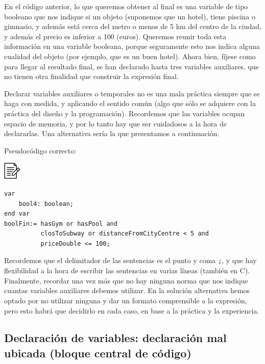 \documentclass[
]{book}
\begin{document}
En el código anterior, lo que queremos obtener al final es una variable de tipo booleano que nos indique si un objeto (suponemos que un hotel), tiene piscina o gimnasio, y además está cerca del metro o menos de 5 km del centro de la ciudad, y además el precio es inferior a 100 (euros). Queremos reunir toda esta información en una variable booleana, porque seguramente esto nos indica alguna cualidad del objeto (por ejemplo, que es un buen hotel). Ahora bien, fíjese como para llegar al resultado final, se han declarado hasta tres variables auxiliares, que no tienen otra finalidad que construir la expresión final.

Declarar variables auxiliares o temporales no es una mala práctica siempre que se haga con medida, y aplicando el sentido común (algo que sólo se adquiere con la práctica del diseño y la programación). Recordemos que las variables ocupan espacio de memoria, y por lo tanto hay que ser cuidadosos a la hora de declararlas. Una alternativa sería la que presentamos a continuación.

Pseudocódigo correcto:

\includegraphics{./img/alg.png}

\begin{verbatim}
var
    bool4: boolean;
end var
boolFin:= hasGym or hasPool and 
          closToSubway or distanceFromCityCentre < 5 and 
          priceDouble <= 100;
\end{verbatim}

Recordemos que el delimitador de las sentencias es el punto y coma \texttt{;}, y que hay flexibilidad a la hora de escribir las sentencias en varias líneas (también en C). Finalmente, recordar una vez más que no hay ninguna norma que nos indique cuantas variables auxiliares debemos utilizar. En la solución alternativa hemos optado por no utilizar ninguna y dar un formato comprensible a la expresión, pero esto habrá que decidirlo en cada caso, en base a la práctica y la experiencia.

\hypertarget{declaraciuxf3n-de-variables-declaraciuxf3n-mal-ubicada-bloque-central-de-cuxf3digo}{%
\subsection{Declaración de variables: declaración mal ubicada (bloque central de código)}\label{declaraciuxf3n-de-variables-declaraciuxf3n-mal-ubicada-bloque-central-de-cuxf3digo}}
\end{document}
